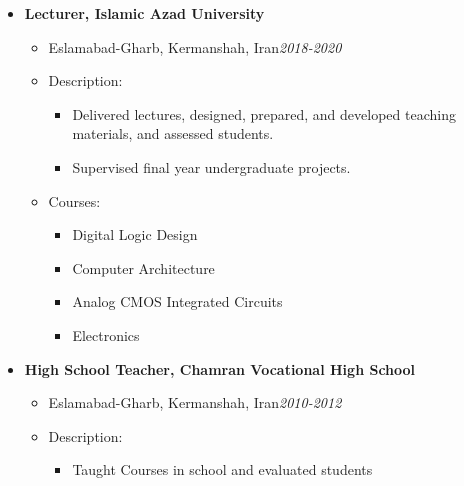 \begin {itemize}
\begin {itemize}
\begin {itemize}
\begin {itemize}
                    \end {itemize}
            \end {itemize} \vspace{0.3cm}         
     \item [$\bullet$] \bf {\mtf \normalsize   Lecturer, Islamic Azad University} \mdseries
            \begin {itemize}
                \item [-]  {  Eslamabad-Gharb, Kermanshah, Iran\small \hspace{5cm}\textit{2018-2020}\normalsize} 
                \item [-]   {  Description:} 
                    \begin {itemize}
                        \item [\textbullet]  Delivered lectures, designed, prepared, and developed teaching materials, and assessed students.
                        \item [\textbullet]  Supervised  final year undergraduate projects.
                    \end {itemize}
                    \item [-]   {   Courses:} 
                    \begin {itemize}   
                        \item [\textbullet] Digital Logic Design
                        \item [\textbullet]  Computer Architecture
                        \item [\textbullet] Analog CMOS Integrated Circuits
                         \item [\textbullet] Electronics
                    \end {itemize}    
            \end {itemize} \vspace{0.3cm}   
     \item [$\bullet$] \bf {\mtf \normalsize   High School Teacher, Chamran Vocational High School} \mdseries
            \begin {itemize}
                \item [-]  {  Eslamabad-Gharb, Kermanshah, Iran\small \hspace{5cm}\textit{2010-2012}\normalsize} 
                \item [-]   { Description:} 
                    \begin {itemize}
                        \item [\textbullet]  Taught Courses in school and evaluated students

\end{itemize}
\end{itemize}
\end{itemize}
\end{itemize}
